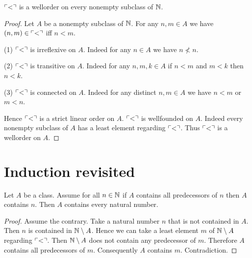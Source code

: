 \documentclass[../arithmetic.tex]{subfiles}
\begin{document}
  \begin{forthel}
    \begin{corollary}
      $\ulcorner<\urcorner$ is a wellorder on every nonempty subclass of $\mathbb{N}$.
    \end{corollary}
    \begin{proof}
      Let $A$ be a nonempty subclass of $\mathbb{N}$.
      For any $n, m \in A$ we have $(n, m) \in \ulcorner<\urcorner$ iff $n \less m$.

      (1) $\ulcorner<\urcorner$ is irreflexive on $A$.
      Indeed for any $n \in A$ we have $n \nless n$.

      (2) $\ulcorner<\urcorner$ is transitive on $A$.
      Indeed for any $n, m, k \in A$ if $n \less m$ and $m \less k$ then $n \less k$.

      (3) $\ulcorner<\urcorner$ is connected on $A$.
      Indeed for any distinct $n, m \in A$ we have $n \less m$ or $m \less n$.

      Hence $\ulcorner<\urcorner$ is a strict linear order on $A$.
      $\ulcorner<\urcorner$ is wellfounded on $A$.
      Indeed every nonempty subclass of $A$ has a least element regarding $\ulcorner<\urcorner$.
      Thus $\ulcorner<\urcorner$ is a wellorder on $A$.
    \end{proof}
  \end{forthel}


  \section{Induction revisited}

  \begin{forthel}
    \begin{theorem}
      Let $A$ be a class.
      Assume for all $n \in \mathbb{N}$ if $A$ contains all predecessors of $n$ then
      $A$ contains $n$.
      Then $A$ contains every natural number.
    \end{theorem}
    \begin{proof}
      Assume the contrary.
      Take a natural number $n$ that is not contained in $A$.
      Then $n$ is contained in $\mathbb{N} \setminus A$.
      Hence we can take a least element $m$ of $\mathbb{N} \setminus A$ regarding
      $\ulcorner<\urcorner$.
      Then $\mathbb{N} \setminus A$ does not contain any predecessor of $m$.
      Therefore $A$ contains all predecessors of $m$.
      Consequently $A$ contains $m$.
      Contradiction.
    \end{proof}
  \end{forthel}
\end{document}
